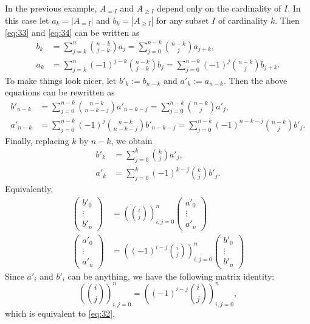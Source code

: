 \documentclass[oneside]{book}
\numberwithin{equation}{section}
\theoremstyle{definition}
\begin{document}
In the previous example, \( A_{=I} \) and \( A_{\ge I} \) depend only
on the cardinality of \( I \). In this case let \( a_k = |A_{=I}| \)
and \( b_k = |A_{\ge I}| \) for any subset \( I \) of cardinality
\( k \).
Then \eqref{eq:33} and \eqref{eq:34} can be written as
\begin{align*}
  b_k  &= \sum_{j=k}^n \binom{n-k}{j-k} a_j
         = \sum_{j=0}^{n-k} \binom{n-k}{j} a_{j+k},  \\
  a_k  &= \sum_{j=k}^n (-1)^{j-k}  \binom{n-k}{j-k} b_j
         = \sum_{j=0}^{n-k} (-1)^{j}  \binom{n-k}{j} b_{j+k}.
\end{align*}
To make things look nicer, let \( b'_k:= b_{n-k} \) and
\( a'_k:= a_{n-k} \).
Then the above equations can be rewritten as
\begin{align*}
  b'_{n-k}  &= \sum_{j=0}^{n-k} \binom{n-k}{n-k-j} a'_{n-k-j}
              = \sum_{j=0}^{n-k} \binom{n-k}{j} a'_{j},  \\
  a'_{n-k}  & = \sum_{j=0}^{n-k} (-1)^{j}  \binom{n-k}{n-k-j} b'_{n-k-j}
              = \sum_{j=0}^{n-k} (-1)^{n-k-j}  \binom{n-k}{j} b'_{j}.
\end{align*}
Finally, replacing \( k \) by \( n-k \), we obtain
\begin{align*}
  b'_{k}  & = \sum_{j=0}^{k} \binom{k}{j} a'_{j},  \\
  a'_{k}  & = \sum_{j=0}^{k} (-1)^{k-j}  \binom{k}{j} b'_{j}.
\end{align*}
Equivalently,
\begin{align*}
  \begin{pmatrix}
b'_0\\
\vdots\\
b'_n
\end{pmatrix}
&= \left( \binom{i}{j} \right)_{i,j=0}^n
\begin{pmatrix}
a'_0\\
\vdots\\
a'_n
\end{pmatrix}\\
  \begin{pmatrix}
a'_0\\
\vdots\\
a'_n
\end{pmatrix}
&= \left( (-1)^{i-j}\binom{i}{j} \right)_{i,j=0}^n
\begin{pmatrix}
b'_0\\
\vdots\\
b'_n
\end{pmatrix}
\end{align*}
Since \( a'_i \) and \( b'_i \) can be anything,
we have the following matrix identity:
\[
  \left( \binom{i}{j} \right)_{i,j=0}^n = 
  \left( (-1)^{i-j} \binom{i}{j} \right)_{i,j=0}^n,
\]
which is equivalent to \eqref{eq:32}.
\end{document}
